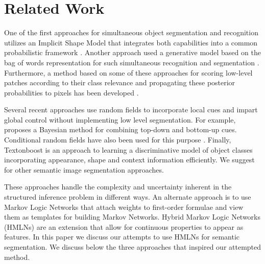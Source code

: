 \documentclass{article} %
\begin{document}

\section{Related Work}
\label{sec:Related}

One of the first approaches for simultaneous object segmentation and recognition utilizes an Implicit Shape Model that integrates both capabilities into a common probabilistic framework \cite{Leibe04combinedobject}. 
Another approach used a generative model based on the bag of words representation for such simultaneous recognition and segmentation \cite{cao:spatially}.  
Furthermore, a method based on some of these approaches for scoring low-level patches according to their class relevance and propagating these posterior probabilities to pixels has been developed \cite{conf/bmvc/CsurkaP08}.

Several recent approaches use random fields to incorporate local cues and impart global control without implementing low level segmentation. For example, \cite{Kumar:2005:OC:1068507.1068889} proposes a Bayesian method for combining top-down and bottom-up cues. Conditional random fields have also been used for this purpose \cite{Kumar:2005:HFF:1097115.1097790} \cite{Richard04multiscaleconditional}. Finally, Textonboost \cite{Shotton06textonboost:joint} is an approach to learning a discriminative model of object classes incorporating appearance, shape and context information efficiently. We suggest \cite{SegmentRegionsParts} for other semantic image segmentation approaches.

These approaches handle the complexity and uncertainty inherent in the structured inference problem in different ways. An alternate approach is to use Markov Logic Networks \cite{Domingos06unifyinglogical} \cite{Richardson06markovlogic} that attach weights to first-order formulae and view them as templates for building Markov Networks. Hybrid Markov Logic Networks (HMLNs)\cite{Wang_hybridmarkov} are an extension that allow for continuous properties to appear as features. In this paper we discuss our attempts to use HMLNs for semantic segmentation. We discuss below the three approaches that inspired our attempted method.  
\end{document}
